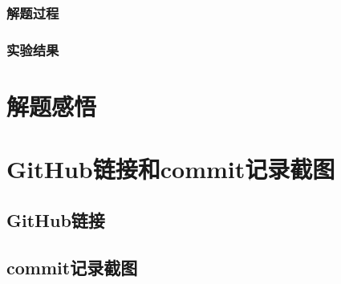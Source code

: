 \documentclass[11pt,a4paper]{ctexart}
\begin{document}
\subsubsection{解题过程}
\mbox{}

\subsubsection{实验结果}
\mbox{}

\section{解题感悟}

\section{GitHub链接和commit记录截图}

\subsection{GitHub链接}

\subsection{commit记录截图}
\end{document}
